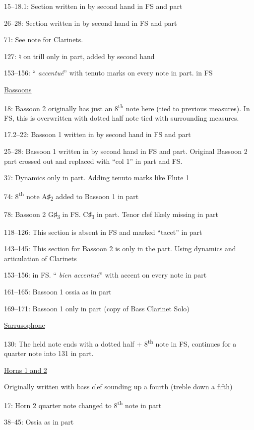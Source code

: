 \documentclass[twoside]{article}
\newcommand\dynmark[1]{\scalebox{0.9}{#1}{\kern1pt}}
\begin{document}
\begin{hangparas}{15pt}{1}
\begin{multicols}{2}
15--18.1: Section written in by second hand in FS and part

26--28: Section written in by second hand in FS and part

71: See note for Clarinets.

127: ♮ on trill only in part, added by second hand

153--156: ``\dynmark{\mf} \textit{accentué}'' with tenuto marks on every note in part. \dynmark{\p} in FS

\underline{Bassoons}

18: Bassoon 2 originally has just an 8\textsuperscript{th} note here (tied to previous measures). In FS, this is overwritten with dotted half note tied with surrounding measures.

17.2--22: Bassoon 1 written in by second hand in FS and part

25--28: Bassoon 1 written in by second hand in FS and part. Original Bassoon 2 part crossed out and replaced with ``col 1'' in part and FS.

37: Dynamics only in part. Adding tenuto marks like Flute 1

74: 8\textsuperscript{th} note A♯\textsubscript{2} added to Bassoon 1 in part

78: Bassoon 2 G♯\textsubscript{3} in FS. C♯\textsubscript{3} in part. Tenor clef likely missing in part

118--126: This section is absent in FS and marked ``tacet'' in part

143--145: This section for Bassoon 2 is only in the part. Using dynamics and articulation of Clarinets

153--156: \dynmark{\p} in FS. ``\dynmark{\mf} \textit{bien accentué}'' with accent on every note in part

161--165: Bassoon 1 ossia as in part

169--171: Bassoon 1 only in part (copy of Bass Clarinet Solo)

\underline{Sarrusophone}

130: The held note ends with a dotted half + 8\textsuperscript{th} note in FS, continues for a quarter note into 131 in part.

\underline{Horns 1 and 2}

Originally written with bass clef sounding up a fourth (treble down a fifth)

17: Horn 2 quarter note changed to 8\textsuperscript{th} note in part

38--45: Ossia as in part


\end{multicols}
\end{hangparas}
\end{document}

